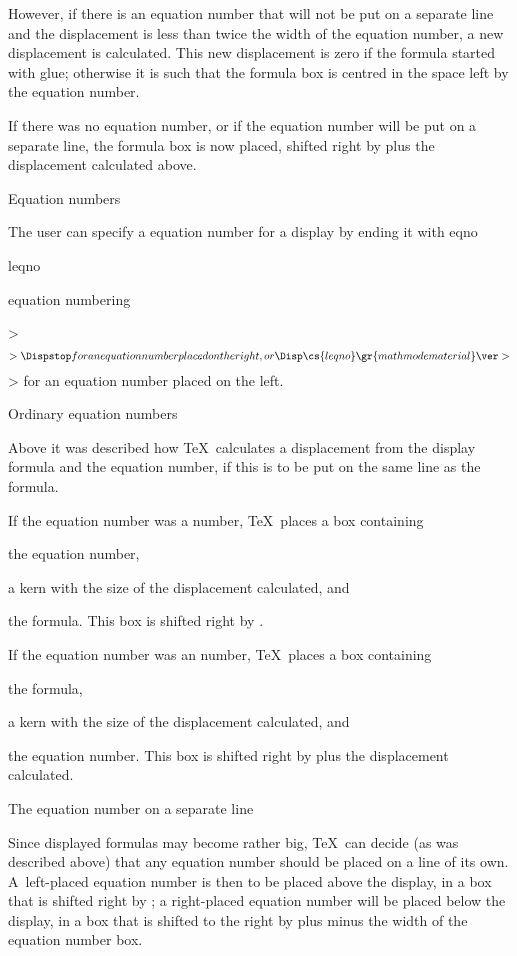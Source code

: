 However, if there is an equation number that will not
be put on a separate line and the displacement is less than
twice the width of the equation number, a new displacement
is calculated. This new displacement is zero if the formula
started with glue; otherwise it is such that the
formula box is centred in the space left by the equation
number.

If there was no equation number, or if the equation number
will be put on a separate line, the formula box
is now placed, shifted right by  plus
the displacement calculated above.

\point Equation numbers

The user can specify a equation number for a display
by ending it with 
\csterm eqno\par\csterm leqno\par\term equation numbering\par
\Disp{}\ver>$$>\Dispstop
for an equation number placed on the right, or
\Disp\cs{leqno}\gr{math mode material}\ver>$$>\Dispstop
for an equation number placed on the left.

\spoint Ordinary equation numbers

Above it was described how \TeX\ calculates a displacement
from the display formula and the equation number, if this
is to be put on the same line as the formula.

If the equation number was a   number,
\TeX\ places a box containing
\itemlist\item the equation number,
\item a kern with the size of the displacement calculated, and
\item the formula.\itemliststop
This box is shifted right by .

If the equation number was an  number,
\TeX\ places a box containing
\itemlist\item the formula,
\item a kern with the size of the displacement calculated, and
\item the equation number.\itemliststop
This box is shifted right by  plus
the displacement calculated.

\spoint The equation number on a separate line

Since displayed formulas may become rather big, \TeX\ can decide
(as was described above)
that any equation number should be placed on a line of its own.
A~left-placed equation number is then to be placed above the
display, in a box that is shifted right by ;
a right-placed equation number will be placed below the display,
in a box that is shifted to the right 
by  plus  minus the width of
the equation number box.

